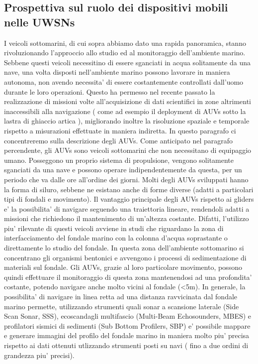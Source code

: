 \subsection{Prospettiva sul ruolo dei dispositivi mobili nelle UWSNs}
I veicoli sottomarini, di cui sopra abbiamo dato una rapida panoramica, stanno rivoluzionando l'approccio allo studio ed al monitoraggio dell'ambiente marino. \newline Sebbene questi veicoli necessitino di essere sganciati in acqua solitamente da una nave, una volta disposti nell'ambiente marino possono lavorare in maniera autonoma, non avendo necessita' di essere costantemente controllati dall'uomo durante le loro operazioni. \newline Questo ha permesso nel recente passato la realizzazione di missioni volte all'acquisizione di dati scientifici in zone altrimenti inaccessibili alla navigazione ( come ad esempio il deployment di AUVs sotto la lastra di ghiaccio artica \cite{wadhams}), migliorando inoltre la risoluzione spaziale e temporale rispetto a misurazioni effettuate in maniera indiretta.\newline
In questo paragrafo ci concentreremo sulla descrizione degli AUVs.
Come anticipato nel paragrafo percendente, gli AUVs sono veicoli sottomarini che non necessitano di equipaggio umano. Posseggono un proprio sistema di propulsione, vengono solitamente sganciati da una nave e possono operare indipendentemente da questa, per un periodo che va dalle ore all'ordine dei giorni. Molti degli AUVs sviluppati hanno la forma di siluro, sebbene ne esistano anche di forme diverse (adatti a particolari tipi di fondali e movimento).\newline
Il vantaggio principale degli AUVs rispetto ai gliders e' la possibilita' di navigare seguendo una traiettoria lineare, rendendoli adatti a missioni che richiedono il mantenimento di un'altezza costante.
Difatti, l'utilizzo piu' rilevante di questi veicoli  avviene in studi che riguardano la zona di interfacciamento del fondale marino con la colonna d'acqua soprastante o direttamente lo studio del fondale.  In questa zona dell'ambiente sottomarino si concentrano gli organismi bentonici e avvengono i processi di sedimentazione di materiali sul fondale. 
Gli AUVs, grazie al loro particolare movimento, possono quindi effettuare il monitoraggio di questa zona mantenendosi ad una profondita' costante, potendo navigare anche molto vicini al fondale (<5m). \newline
In generale, la possibilita' di navigare in linea retta ad una distanza ravvicinata dal fondale marino permette, utilizzando strumenti quali sonar a scansione laterale (Side Scan Sonar, SSS), ecoscandagli multifascio (Multi-Beam Echosounders, MBES) e profilatori sismici di sedimenti (Sub Bottom Profilers, SBP) e' possibile mappare e generare immagini del profilo del fondale marino in maniera molto piu' precisa rispetto ai dati ottenuti utlizzando strumenti posti su navi ( fino a due ordini di grandezza piu' precisi). \newline 
